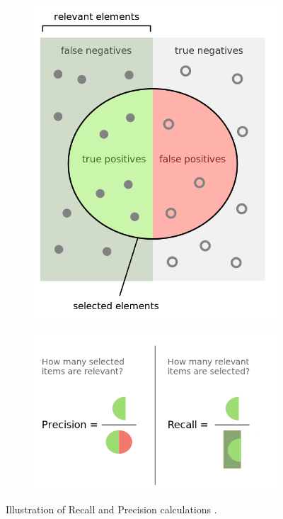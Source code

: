         \begin{figure}[H]
            \centering
            \captionsetup{justification=centering}
            \begin{subfigure}{0.3\textwidth}
                \includegraphics[width=\textwidth]{Sections/5ImageClef/images/f1_1.png}
                \end{subfigure}
                \begin{subfigure}{0.4\textwidth}
                \includegraphics[width=\textwidth]{Sections/5ImageClef/images/f1_2.png}
                \end{subfigure}
            \caption[Illustration of recall and precision calculation]{Illustration of Recall and Precision calculations \cite{Wikipedia2020}.}   
            \label{fig:ex_f1}        
           
        \end{figure}
        

